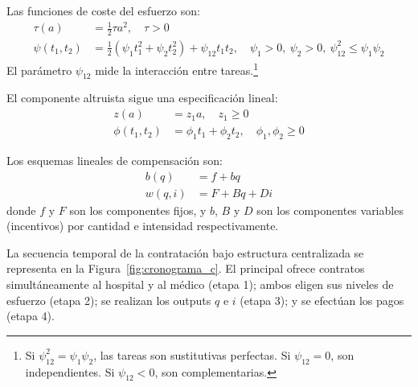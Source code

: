 \documentclass[12pt, a4paper, twoside, openright]{book}
\theoremstyle{plain}
\theoremstyle{definition}
\theoremstyle{remark}
\begin{document}
Las funciones de coste del esfuerzo son:
\begin{align}
  \tau(a) &= \frac{1}{2}\tau a^2, \quad \tau>0 \label{eq:coste_h}\\
  \psi(t_1,t_2) &= \frac{1}{2}(\psi_1t_1^2+\psi_2t_2^2)+\psi_{12}t_1t_2, \quad \psi_1>0,\ \psi_2>0,\ \psi_{12}^2 \leq \psi_1\psi_2 \label{eq:coste_m}
\end{align}
El parámetro $\psi_{12}$ mide la interacción entre tareas.\footnote{Si $\psi_{12}^2=\psi_1\psi_2$, las tareas son sustitutivas perfectas. Si $\psi_{12}=0$, son independientes. Si $\psi_{12}<0$, son complementarias.}

El componente altruista sigue una especificación lineal:
\begin{align}
  z(a) &= z_1 a, \quad z_1 \geq 0 \label{eq:altruismo_h}\\
  \phi(t_1,t_2) &= \phi_1 t_1+\phi_2 t_2, \quad \phi_1, \phi_2 \geq 0 \label{eq:altruismo_m}
\end{align}

Los esquemas lineales de compensación son:
\begin{align}
  b(q) &= f+bq \label{eq:pago_h_lineal}\\
  w(q,i) &= F+Bq+Di \label{eq:pago_m_lineal}
\end{align}
donde $f$ y $F$ son los componentes fijos, y $b$, $B$ y $D$ son los componentes variables (incentivos) por cantidad e intensidad respectivamente.

La secuencia temporal de la contratación bajo estructura centralizada se representa en la Figura~\ref{fig:cronograma_c}. El principal ofrece contratos simultáneamente al hospital y al médico (etapa 1); ambos eligen sus niveles de esfuerzo (etapa 2); se realizan los outputs $q$ e $i$ (etapa 3); y se efectúan los pagos (etapa 4).
\end{document}
